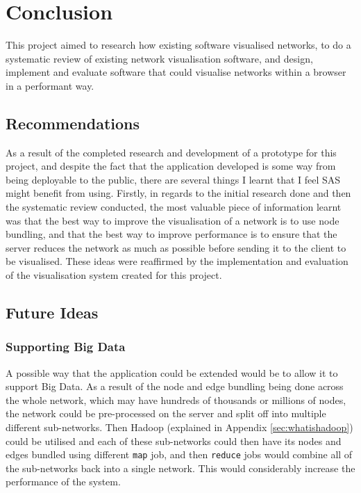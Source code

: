 \documentclass[../dissertation.tex]{subfiles}
\begin{document}
\chapter{Conclusion}

This project aimed to research how existing software visualised networks, to do a systematic review of existing network visualisation software, and design, implement and evaluate software that could visualise networks within a browser in a performant way. 

\section{Recommendations}

As a result of the completed research and development of a prototype for this project, and despite the fact that the application developed is some way from being deployable to the public, there are several things I learnt that I feel SAS might benefit from using. Firstly, in regards to the initial research done and then the systematic review conducted, the most valuable piece of information learnt was that the best way to improve the visualisation of a network is to use node bundling, and that the best way to improve performance is to ensure that the server reduces the network as much as possible before sending it to the client to be visualised. These ideas were reaffirmed by the implementation and evaluation of the visualisation system created for this project.

\section{Future Ideas}
\label{sec:further_ideas}

\subsection{Supporting Big Data}

A possible way that the application could be extended would be to allow it to support Big Data. As a result of the node and edge bundling being done across the whole network, which may have hundreds of thousands or millions of nodes, the network could be pre-processed on the server and split off into multiple different sub-networks. Then Hadoop \cite{hadoop} (explained in Appendix \ref{sec:whatishadoop}) could be utilised and each of these sub-networks could then have its nodes and edges bundled using different \texttt{map} job, and then \texttt{reduce} jobs would combine all of the sub-networks back into a single network. This would considerably increase the performance of the system.
\end{document}
